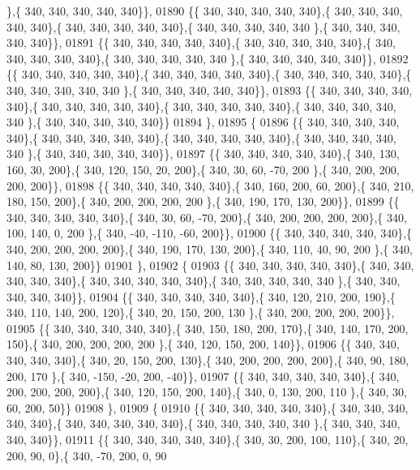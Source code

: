 \begin{DoxyCode}
      \},\{ 340, 340, 340, 340, 340\}\},
01890 \{\{ 340, 340, 340, 340, 340\},\{ 340, 340, 340, 340, 340\},\{ 340, 340, 340, 340, 340\},\{ 340, 340, 340, 340, 340
      \},\{ 340, 340, 340, 340, 340\}\},
01891 \{\{ 340, 340, 340, 340, 340\},\{ 340, 340, 340, 340, 340\},\{ 340, 340, 340, 340, 340\},\{ 340, 340, 340, 340, 340
      \},\{ 340, 340, 340, 340, 340\}\},
01892 \{\{ 340, 340, 340, 340, 340\},\{ 340, 340, 340, 340, 340\},\{ 340, 340, 340, 340, 340\},\{ 340, 340, 340, 340, 340
      \},\{ 340, 340, 340, 340, 340\}\},
01893 \{\{ 340, 340, 340, 340, 340\},\{ 340, 340, 340, 340, 340\},\{ 340, 340, 340, 340, 340\},\{ 340, 340, 340, 340, 340
      \},\{ 340, 340, 340, 340, 340\}\}
01894 \},
01895 \{
01896 \{\{ 340, 340, 340, 340, 340\},\{ 340, 340, 340, 340, 340\},\{ 340, 340, 340, 340, 340\},\{ 340, 340, 340, 340, 340
      \},\{ 340, 340, 340, 340, 340\}\},
01897 \{\{ 340, 340, 340, 340, 340\},\{ 340, 130, 160,  30, 200\},\{ 340, 120, 150,  20, 200\},\{ 340,  30,  60, -70, 200
      \},\{ 340, 200, 200, 200, 200\}\},
01898 \{\{ 340, 340, 340, 340, 340\},\{ 340, 160, 200,  60, 200\},\{ 340, 210, 180, 150, 200\},\{ 340, 200, 200, 200, 200
      \},\{ 340, 190, 170, 130, 200\}\},
01899 \{\{ 340, 340, 340, 340, 340\},\{ 340,  30,  60, -70, 200\},\{ 340, 200, 200, 200, 200\},\{ 340, 100, 140,   0, 200
      \},\{ 340, -40, -110, -60, 200\}\},
01900 \{\{ 340, 340, 340, 340, 340\},\{ 340, 200, 200, 200, 200\},\{ 340, 190, 170, 130, 200\},\{ 340, 110,  40,  90, 200
      \},\{ 340, 140,  80, 130, 200\}\}
01901 \},
01902 \{
01903 \{\{ 340, 340, 340, 340, 340\},\{ 340, 340, 340, 340, 340\},\{ 340, 340, 340, 340, 340\},\{ 340, 340, 340, 340, 340
      \},\{ 340, 340, 340, 340, 340\}\},
01904 \{\{ 340, 340, 340, 340, 340\},\{ 340, 120, 210, 200, 190\},\{ 340, 110, 140, 200, 120\},\{ 340,  20, 150, 200, 130
      \},\{ 340, 200, 200, 200, 200\}\},
01905 \{\{ 340, 340, 340, 340, 340\},\{ 340, 150, 180, 200, 170\},\{ 340, 140, 170, 200, 150\},\{ 340, 200, 200, 200, 200
      \},\{ 340, 120, 150, 200, 140\}\},
01906 \{\{ 340, 340, 340, 340, 340\},\{ 340,  20, 150, 200, 130\},\{ 340, 200, 200, 200, 200\},\{ 340,  90, 180, 200, 170
      \},\{ 340, -150, -20, 200, -40\}\},
01907 \{\{ 340, 340, 340, 340, 340\},\{ 340, 200, 200, 200, 200\},\{ 340, 120, 150, 200, 140\},\{ 340,   0, 130, 200, 110
      \},\{ 340,  30,  60, 200,  50\}\}
01908 \},
01909 \{
01910 \{\{ 340, 340, 340, 340, 340\},\{ 340, 340, 340, 340, 340\},\{ 340, 340, 340, 340, 340\},\{ 340, 340, 340, 340, 340
      \},\{ 340, 340, 340, 340, 340\}\},
01911 \{\{ 340, 340, 340, 340, 340\},\{ 340,  30, 200, 100, 110\},\{ 340,  20, 200,  90,   0\},\{ 340, -70, 200,   0,  90

\end{DoxyCode}
